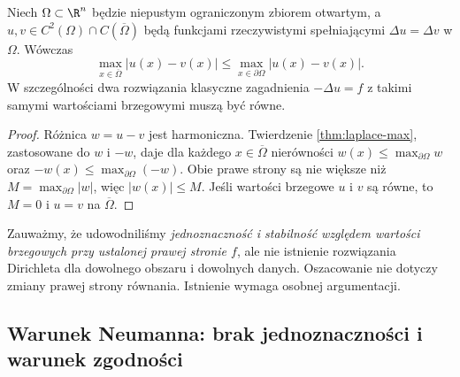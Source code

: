 \begin{wniosek}
\label{cor:dirichlet-stability}
Niech $\Omega\subset\R^n$ będzie niepustym ograniczonym
zbiorem otwartym, a $u,v\in C^2(\Omega)\cap
C(\overline\Omega)$ będą funkcjami rzeczywistymi spełniającymi $\Delta u=\Delta v$
w $\Omega$. Wówczas
\[
 \max_{x\in\overline\Omega}|u(x)-v(x)|
 \leq\max_{x\in\partial\Omega}|u(x)-v(x)|.
\]
W szczególności dwa rozwiązania klasyczne zagadnienia
$-\Delta u=f$ z takimi samymi wartościami brzegowymi
muszą być równe.
\end{wniosek}
\begin{proof}
Różnica $w=u-v$ jest harmoniczna. Twierdzenie
\ref{thm:laplace-max}, zastosowane do $w$ i $-w$,
daje dla każdego $x\in\overline\Omega$ nierówności
$w(x)\leq\max_{\partial\Omega}w$ oraz
$-w(x)\leq\max_{\partial\Omega}(-w)$.
Obie prawe strony są nie większe niż
$M=\max_{\partial\Omega}|w|$, więc $|w(x)|\leq M$.
Jeśli wartości brzegowe $u$ i $v$ są równe, to $M=0$
i $u=v$ na $\overline\Omega$.
\end{proof}

Zauważmy, że udowodniliśmy \emph{jednoznaczność i stabilność
względem wartości brzegowych przy ustalonej prawej stronie $f$},
ale nie istnienie rozwiązania Dirichleta dla dowolnego obszaru
i dowolnych danych. Oszacowanie nie dotyczy zmiany prawej
strony równania. Istnienie wymaga osobnej argumentacji.

\subsection{Warunek Neumanna: brak jednoznaczności i warunek zgodności}

